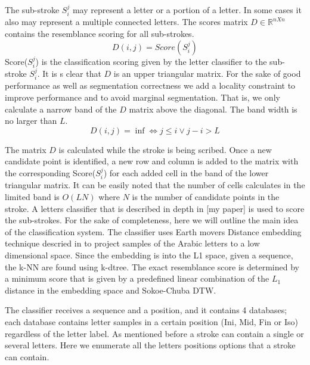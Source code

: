 \documentclass[12pt,journal,compsoc]{IEEEtran}
\begin{document}
The sub-stroke  $S_{i}^{j}$ may represent a letter or a portion of a letter. In some cases it also may represent a multiple connected letters. The scores matrix $D\in\mathbb{R}^{nXn}$ contains the resemblance scoring for all sub-strokes. 
\begin{equation}
D(i,j)=Score(S_{i}^{j})
\end{equation}
Score($S_{i}^{j}$) is the classification scoring given by the letter classifier to the sub-stroke $S_{i}^{j}$. It is s clear that $D$ is an upper triangular matrix. For the sake of good performance as well as segmentation correctness we add a locality constraint to improve performance and to avoid marginal segmentation. That is, we only calculate a narrow band of the $D$ matrix above the diagonal. The band width is no larger than $L$.
\begin{equation}
D(i,j)=\inf \Leftrightarrow j \leq i \vee j-i>L 
\end{equation}

The matrix $D$ is calculated while the stroke is being scribed. Once a new candidate point is identified, a new row and column is added to the matrix with the corresponding Score($S_{i}^{j}$) for each added cell in the band of the lower triangular matrix. It can be easily noted that the number of cells calculates in the limited band is $O(LN)$ where $N$ is the number of candidate points in the stroke. 
A letters classifier that is described in depth in [my paper] is used to score the sub-strokes. For the sake of completeness, here we will outline the main idea of the classification system. The classifier uses Earth movers Distance embedding technique descried in \cite{shirdhonkar2008approximate} to project samples of the Arabic letters to a low dimensional space. Since the embedding is into the L1 space, given a sequence, the k-NN are found using k-dtree. The exact resemblance score is determined by a minimum score that is given by a predefined linear combination of the $L_{1}$ distance in the embedding space and Sokoe-Chuba DTW.

The classifier receives a sequence and a position, and it contains 4 databases; each database contains letter samples in a certain position (Ini, Mid, Fin or Iso) regardless of the letter label. As mentioned before a stroke can contain a single or several letters. Here we enumerate all the letters positions options that a stroke can contain.  
\end{document}
